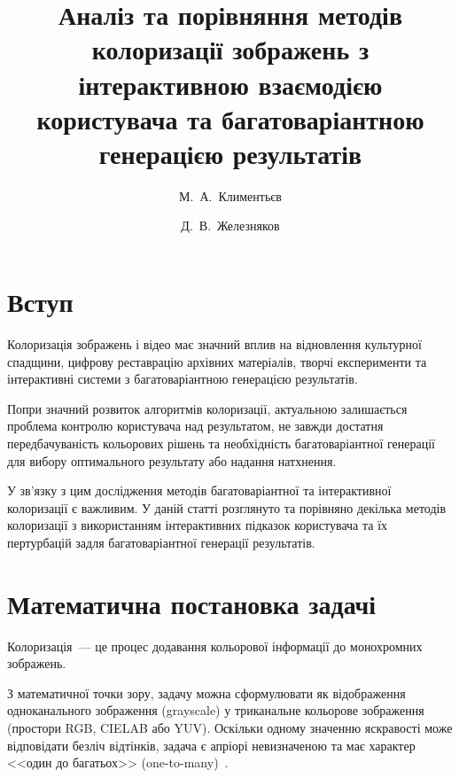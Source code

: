 \documentclass[]{iptconf}
\title{Аналіз та порівняння методів колоризації зображень з інтерактивною взаємодією користувача та багатоваріантною генерацією результатів}
\author[dadmon1901@gmail.com]{М.~А.~Климентьєв}{1}
\author{Д.~В.~Железняков}{1, 2}
\affiliation{\ipt}{1}
\affiliation{Samsung R\&D Institute Ukraine}{2}
\begin{document}


	\section*{Вступ}
	
		Колоризація зображень і відео має значний вплив на відновлення культурної спадщини, цифрову реставрацію архівних матеріалів, творчі експерименти та інтерактивні системи з багатоваріантною генерацією результатів.
		
		Попри значний розвиток алгоритмів колоризації, актуальною залишається проблема контролю користувача над результатом, не завжди достатня передбачуваність кольорових рішень та необхідність багатоваріантної генерації для вибору оптимального результату або надання натхнення.
		
		У зв'язку з цим дослідження методів багатоваріантної та інтерактивної колоризації є важливим. У даній статті розглянуто та порівняно декілька методів колоризації з використанням інтерактивних підказок користувача та їх пертурбацій задля багатоваріантної генерації результатів.

	\section{Математична постановка задачі}
	
		Колоризація~--- це процес додавання кольорової інформації до монохромних зображень.

		З математичної точки зору, задачу можна сформулювати як відображення одноканального зображення (grayscale) у триканальне кольорове зображення (простори RGB, CIELAB або YUV).
		Оскільки одному значенню яскравості може відповідати безліч відтінків, задача є апріорі невизначеною та має характер <<один до багатьох>> (one-to-many)~\cite{2016-colorful-image-colorization}.

\end{document}
